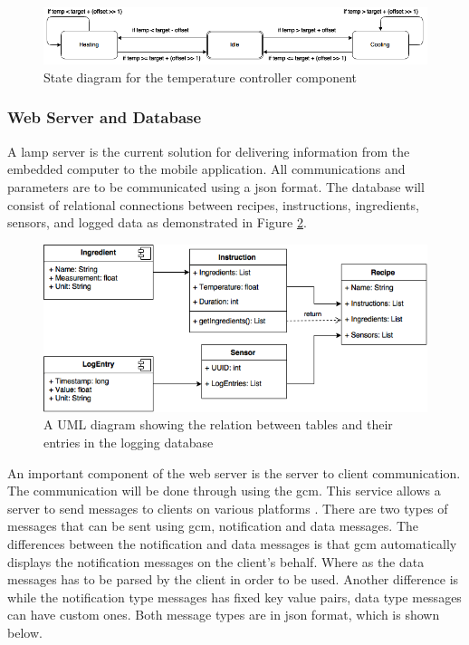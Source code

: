 \documentclass{article}
\begin{document}
\begin{figure}[H]
\begin{center}
\includegraphics[scale=0.50]{temperature-controller-state-diagram.png}
\caption{State diagram for the temperature controller component}
\label{fig:temperature-controller}
\end{center}
\end{figure}

\subsubsection{Web Server and Database}\label{sec:webserver}
A \gls{lamp} server is the current solution for delivering information from the embedded computer to the mobile application.  All communications and parameters are to be communicated using a \gls{json} format.  The database will consist of relational connections between recipes, instructions, ingredients, sensors, and logged data as demonstrated in Figure \ref{fig:database-diagram}.

\begin{figure}[H]
\begin{center}
\includegraphics[scale=0.60]{database-uml-diagram.png}
\caption{A UML diagram showing the relation between tables and their entries in the logging database}
\label{fig:database-diagram}
\end{center}
\end{figure}

An important component of the web server is the server to client communication. The communication will be done through using the \gls{gcm}. This service allows a server to send messages to clients on various platforms \cite{gcm}.  There are two types of messages that can be sent using \gls{gcm}, notification and data messages. The differences between the notification and data messages is that \gls{gcm} automatically displays the notification messages on the client's behalf. Where as the data messages has to be parsed by the client in order to be used. Another difference is while the notification type messages has fixed key value pairs, data type messages can have custom ones. Both message types are in \gls{json} format, which is shown below.
\end{document}

